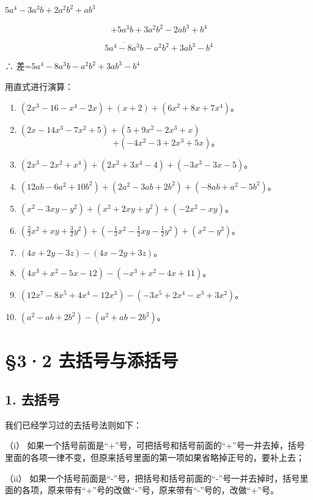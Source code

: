 \(5a^{4} - 3a^{3}b + 2a^{2}b^{2} + ab^{3}\)

\[
+ 5 a ^{3} b + 3 a ^{2} b ^{2} - 2 a b ^{3} + b ^{4}
\]

\[
\overline {{5 a ^{4} - 8 a ^{3} b}} - a ^{2} b ^{2} + 3 a b ^{3} - b ^{4}
\]

∴ 差=\(5a^{4}-8a^{3}b-a^{2}b^{2}+3ab^{3}-b^{4}\)

用直式进行演算：

\begin{enumerate}[start=1]
\item
  \((2x^{3} - 16 - x^{4} - 2x) + (x + 2) + (6x^{2} + 8x + 7x^{4})\)。
\item
  \((2x - 14x^{3} - 7x^{2} + 5) + (5 + 9x^{2} - 2x^{3} + x)\)
\[
+ (- 4 x ^{2} - 3 + 2 x ^{3} + 5 x)\text{。}
\]
\item
  \((2x^{3} - 2x^{2} + x^{4}) + (2x^{2} + 3x^{4} - 4) + (-3x^{3} - 3x - 5)\)。
\item
  \((12ab - 6a^2 + 10b^2) + (2a^2 - 3ab + 2b^2) + (-8ab + a^2 - 5b^2)\)。
\item
  \((x^{2} - 3xy - y^{2}) + (x^{2} + 2xy + y^{2}) + (-2x^{2} - xy)\)。
\item
  \(\left(\frac{2}{3} x^2 + xy + \frac{3}{2} y^2\right) + \left(-\frac{1}{3} x^2 - \frac{1}{2} xy - \frac{1}{2} y^2\right) + (x^2 - y^2)\)。
\item
  \((4x + 2y - 3z) - (4x - 2y + 3z)\)。
\item
  \((4x^{3} + x^{2} - 5x - 12) - (-x^{3} + x^{2} - 4x + 11)\)。
\item
  \((12x^{7} - 8x^{5} + 4x^{4} - 12x^{3}) - (-3x^{5} + 2x^{4} - x^{3} + 3x^{2})\)。
\item
  \((a^2 - ab + 2b^2) - (a^2 + ab - 2b^2)\)。
\end{enumerate}

\section{§3·2 去括号与添括号}

\subsection{1. 去括号}

我们已经学习过的去括号法则如下：

（i）
如果一个括号前面是``+''号，可把括号和括号前面的``+''号一并去掉，括号里面的各项一律不变，但原来括号里面的第一项如果省略掉正号的，要补上去；

（ii）
如果一个括号前面是``-''号，把括号和括号前面的``-''号一并去掉时，括号里面的各项，原来带有``+''号的改做``-''号，原来带有``-''号的，改做``+''号。

